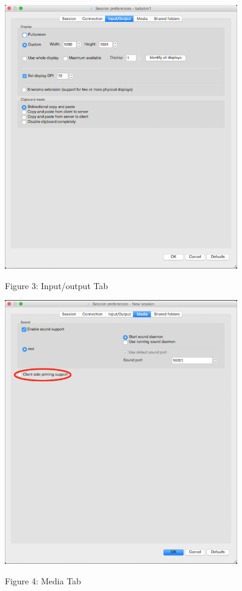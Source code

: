 \documentclass{article}
\begin{document}
\includegraphics[width=4.00394in,height=4.5315in]{images/media/image3.png}

Figure 3: Input/output Tab

\includegraphics[width=4.00394in,height=4.5315in]{images/media/image4.png}

Figure 4: Media Tab
\end{document}
